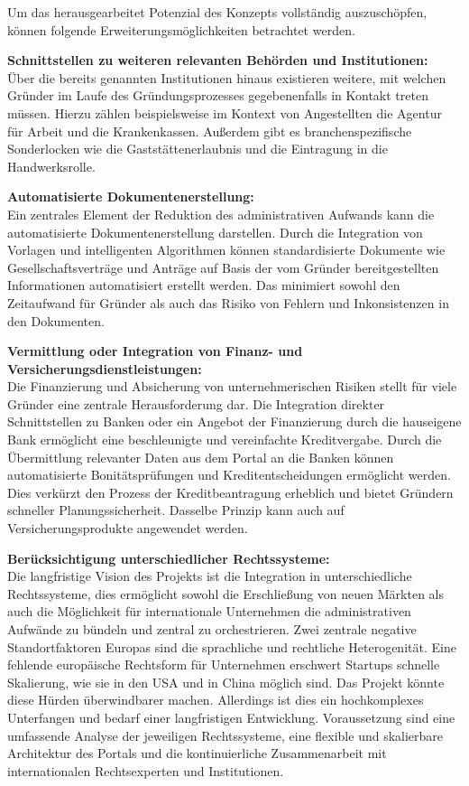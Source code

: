 Um das herausgearbeitet Potenzial des Konzepts vollständig auszuschöpfen, können folgende Erweiterungsmöglichkeiten betrachtet werden.

\textbf{Schnittstellen zu weiteren relevanten Behörden und Institutionen:} \\
Über die bereits genannten Institutionen hinaus existieren weitere, mit welchen Gründer im Laufe des Gründungsprozesses gegebenenfalls in Kontakt treten müssen.
Hierzu zählen beispielsweise im Kontext von Angestellten die Agentur für Arbeit und die Krankenkassen.
Außerdem gibt es branchenspezifische Sonderlocken wie die Gaststättenerlaubnis und die Eintragung in die Handwerksrolle.

\textbf{Automatisierte Dokumentenerstellung:} \\
Ein zentrales Element der Reduktion des administrativen Aufwands kann die automatisierte Dokumentenerstellung darstellen.
Durch die Integration von Vorlagen und intelligenten Algorithmen können standardisierte Dokumente wie Gesellschaftsverträge und Anträge auf Basis der vom Gründer bereitgestellten Informationen automatisiert erstellt werden.
Das minimiert sowohl den Zeitaufwand für Gründer als auch das Risiko von Fehlern und Inkonsistenzen in den Dokumenten.

\textbf{Vermittlung oder Integration von Finanz- und Versicherungsdienstleistungen:} \\
Die Finanzierung und Absicherung von unternehmerischen Risiken stellt für viele Gründer eine zentrale Herausforderung dar.
Die Integration direkter Schnittstellen zu Banken oder ein Angebot der Finanzierung durch die hauseigene Bank ermöglicht eine beschleunigte und vereinfachte Kreditvergabe.
Durch die Übermittlung relevanter Daten aus dem Portal an die Banken können automatisierte Bonitätsprüfungen und Kreditentscheidungen ermöglicht werden. Dies verkürzt den Prozess der Kreditbeantragung erheblich und bietet Gründern schneller Planungssicherheit.
Dasselbe Prinzip kann auch auf Versicherungsprodukte angewendet werden.

\textbf{Berücksichtigung unterschiedlicher Rechtssysteme:} \\
Die langfristige Vision des Projekts ist die Integration in unterschiedliche Rechtssysteme, dies ermöglicht sowohl die Erschließung von neuen Märkten als auch die Möglichkeit für internationale Unternehmen die administrativen Aufwände zu bündeln und zentral zu orchestrieren.
Zwei zentrale negative Standortfaktoren Europas sind die sprachliche und rechtliche Heterogenität. Eine fehlende europäische Rechtsform für Unternehmen erschwert Startups schnelle Skalierung, wie sie in den USA und in China möglich sind.
Das Projekt könnte diese Hürden überwindbarer machen. Allerdings ist dies ein hochkomplexes Unterfangen und bedarf einer langfristigen Entwicklung. Voraussetzung sind eine umfassende Analyse der jeweiligen Rechtssysteme, eine flexible und skalierbare Architektur des Portals und die kontinuierliche Zusammenarbeit mit internationalen Rechtsexperten und Institutionen.


